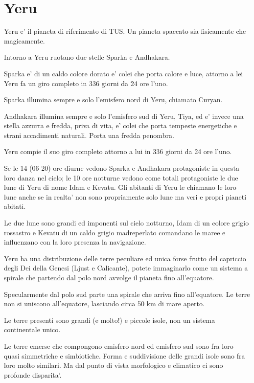 \documentclass[a4paper,11pt,twoside,openany]{dndbook}
\begin{document}
{\pagebreak

\section{Yeru}

\label{yeru}

Yeru e' il pianeta di riferimento di TUS. Un pianeta spaccato sia fisicamente che magicamente.

Intorno a Yeru ruotano due stelle Sparka e Andhakara.

Sparka e' di un caldo colore dorato e' colei che porta calore e luce, attorno a lei Yeru fa un giro completo in 336 giorni da 24 ore l'uno. 

Sparka illumina sempre e solo l'emisfero nord di Yeru, chiamato Curyan.

Andhakara illumina sempre e solo l'emisfero sud di Yeru, Tiya, ed e' invece una stella azzurra e fredda, priva di vita, e' colei che porta tempeste energetiche e strani accadimenti naturali. Porta una fredda penombra.

Yeru compie il suo giro completo attorno a lui in 336 giorni da 24 ore l'uno.

Se le 14 (06-20) ore diurne vedono Sparka e Andhakara protagoniste in questa loro danza nel cielo; le 10 ore notturne vedono come totali protagoniste le due lune di Yeru di nome Idam e Kevatu. Gli abitanti di Yeru le chiamano le loro lune anche se in realta' non sono propriamente solo lune ma veri e propri pianeti abitati.

Le due lune sono grandi ed imponenti sul cielo notturno, Idam di un colore grigio rossastro e Kevatu di un caldo grigio madreperlato comandano le maree e influenzano con la loro presenza la navigazione. 

Yeru ha una distribuzione delle terre peculiare ed unica forse frutto del capriccio degli Dei della Genesi (Ljust e Calicante), potete immaginarlo come un sistema a spirale che partendo dal polo nord avvolge il pianeta fino all'equatore. 

Specularmente dal polo sud parte una spirale che arriva fino all'equatore. Le terre non si uniscono all'equatore, lasciando circa 50 km di mare aperto.

Le terre presenti sono grandi (e molto!) e piccole isole, non un sistema continentale unico.

Le terre emerse che compongono emisfero nord ed emisfero sud sono fra loro quasi simmetriche e simbiotiche. Forma e suddivisione delle grandi isole sono fra loro molto similari. Ma dal punto di vista morfologico e climatico ci sono profonde disparita'.

}
\end{document}
